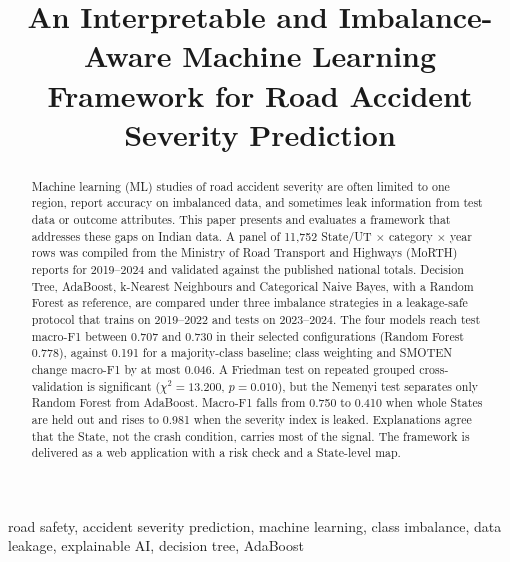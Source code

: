 \documentclass[conference]{IEEEtran}
\begin{document}
\title{An Interpretable and Imbalance-Aware Machine Learning Framework for Road Accident Severity Prediction}

\author{
}

\maketitle

\begin{abstract}
Machine learning (ML) studies of road accident severity are often limited to one region, report accuracy on imbalanced data, and sometimes leak information from test data or outcome attributes. This paper presents and evaluates a framework that addresses these gaps on Indian data. A panel of 11,752 State/UT $\times$ category $\times$ year rows was compiled from the Ministry of Road Transport and Highways (MoRTH) reports for 2019--2024 and validated against the published national totals. Decision Tree, AdaBoost, k-Nearest Neighbours and Categorical Naive Bayes, with a Random Forest as reference, are compared under three imbalance strategies in a leakage-safe protocol that trains on 2019--2022 and tests on 2023--2024. The four models reach test macro-F1 between 0.707 and 0.730 in their selected configurations (Random Forest 0.778), against 0.191 for a majority-class baseline; class weighting and SMOTEN change macro-F1 by at most 0.046. A Friedman test on repeated grouped cross-validation is significant ($\chi^2 = 13.200$, $p = 0.010$), but the Nemenyi test separates only Random Forest from AdaBoost. Macro-F1 falls from 0.750 to 0.410 when whole States are held out and rises to 0.981 when the severity index is leaked. Explanations agree that the State, not the crash condition, carries most of the signal. The framework is delivered as a web application with a risk check and a State-level map.
\end{abstract}

\begin{IEEEkeywords}
road safety, accident severity prediction, machine learning, class imbalance, data leakage, explainable AI, decision tree, AdaBoost
\end{IEEEkeywords}

\end{document}
